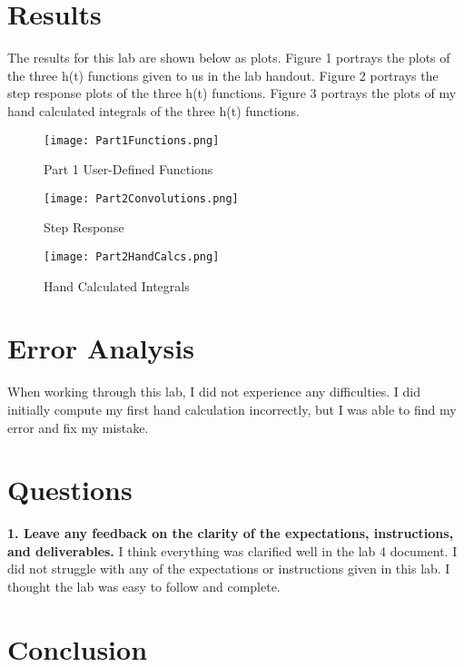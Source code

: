 \documentclass[12pt]{report}
\begin{document}
\section{Results}

The results for this lab are shown below as plots. Figure 1 portrays the plots of the three h(t) functions given to us in the lab handout. Figure 2 portrays the step response plots of the three h(t) functions. Figure 3 portrays the plots of my hand calculated integrals of the three h(t) functions.    



\begin{figure}
\texttt{[image: Part1Functions.png]}
\caption{Part 1 User-Defined Functions}
\end{figure}

\begin{figure}
\texttt{[image: Part2Convolutions.png]}
\caption{Step Response}
\end{figure}

\begin{figure}
\texttt{[image: Part2HandCalcs.png]}
\caption{Hand Calculated Integrals}
\end{figure}



\newpage

\section{Error Analysis}

When working through this lab, I did not experience any difficulties. I did initially compute my first hand calculation incorrectly, but I was able to find my error and fix my mistake. 



\section{Questions}

\textbf{1. Leave any feedback on the clarity of the expectations, instructions, and deliverables.}
{I think everything was clarified well in the lab 4 document. I did not struggle with any of the expectations or instructions given in this lab. I thought the lab was easy to follow and complete. }



\section{Conclusion}
\end{document}
